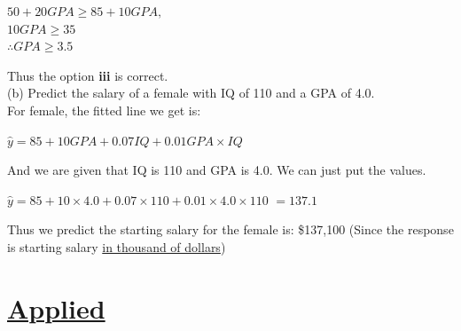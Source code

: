 \documentclass{article}
\begin{document}
\begin{center}
    $50 + 20GPA \geq 85 + 10GPA,$ \\
    $10GPA \geq 35$ \\
    $\therefore GPA \geq 3.5$ \\
\end{center}
Thus the option \textbf{iii} is correct. \\
(b) Predict the salary of a female with IQ of 110 and a GPA of 4.0. \\
For female, the fitted line we get is:  
\begin{center}
    $\hat{y}= 85 + 10GPA + 0.07IQ + 0.01GPA\times IQ$
\end{center}
And we are given that IQ is 110 and GPA is 4.0. We can just put the values.
\begin{center}
    $\hat{y}= 85 + 10\times 4.0 + 0.07\times 110 + 0.01\times 4.0 \times 110$
    $ = 137.1$
\end{center}
Thus we predict the starting salary for the female is: \$137,100 (Since the response is starting salary \underline{in thousand of dollars})

\section*{\underline{Applied}}
\end{document}
